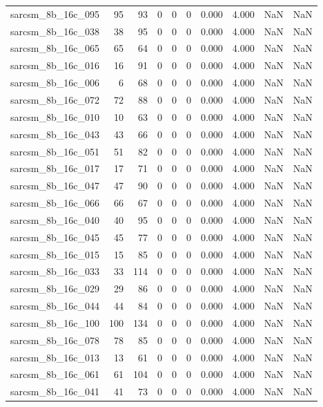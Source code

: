 \documentclass{article}
\begin{document}
\begin{longtable}{lrrrrrrrrr}
sarcsm\_8b\_16c\_095 & 95 & 93 & 0 & 0 & 0 & 0.000 & 4.000 & NaN & NaN \\
sarcsm\_8b\_16c\_038 & 38 & 95 & 0 & 0 & 0 & 0.000 & 4.000 & NaN & NaN \\
sarcsm\_8b\_16c\_065 & 65 & 64 & 0 & 0 & 0 & 0.000 & 4.000 & NaN & NaN \\
sarcsm\_8b\_16c\_016 & 16 & 91 & 0 & 0 & 0 & 0.000 & 4.000 & NaN & NaN \\
sarcsm\_8b\_16c\_006 & 6 & 68 & 0 & 0 & 0 & 0.000 & 4.000 & NaN & NaN \\
sarcsm\_8b\_16c\_072 & 72 & 88 & 0 & 0 & 0 & 0.000 & 4.000 & NaN & NaN \\
sarcsm\_8b\_16c\_010 & 10 & 63 & 0 & 0 & 0 & 0.000 & 4.000 & NaN & NaN \\
sarcsm\_8b\_16c\_043 & 43 & 66 & 0 & 0 & 0 & 0.000 & 4.000 & NaN & NaN \\
sarcsm\_8b\_16c\_051 & 51 & 82 & 0 & 0 & 0 & 0.000 & 4.000 & NaN & NaN \\
sarcsm\_8b\_16c\_017 & 17 & 71 & 0 & 0 & 0 & 0.000 & 4.000 & NaN & NaN \\
sarcsm\_8b\_16c\_047 & 47 & 90 & 0 & 0 & 0 & 0.000 & 4.000 & NaN & NaN \\
sarcsm\_8b\_16c\_066 & 66 & 67 & 0 & 0 & 0 & 0.000 & 4.000 & NaN & NaN \\
sarcsm\_8b\_16c\_040 & 40 & 95 & 0 & 0 & 0 & 0.000 & 4.000 & NaN & NaN \\
sarcsm\_8b\_16c\_045 & 45 & 77 & 0 & 0 & 0 & 0.000 & 4.000 & NaN & NaN \\
sarcsm\_8b\_16c\_015 & 15 & 85 & 0 & 0 & 0 & 0.000 & 4.000 & NaN & NaN \\
sarcsm\_8b\_16c\_033 & 33 & 114 & 0 & 0 & 0 & 0.000 & 4.000 & NaN & NaN \\
sarcsm\_8b\_16c\_029 & 29 & 86 & 0 & 0 & 0 & 0.000 & 4.000 & NaN & NaN \\
sarcsm\_8b\_16c\_044 & 44 & 84 & 0 & 0 & 0 & 0.000 & 4.000 & NaN & NaN \\
sarcsm\_8b\_16c\_100 & 100 & 134 & 0 & 0 & 0 & 0.000 & 4.000 & NaN & NaN \\
sarcsm\_8b\_16c\_078 & 78 & 85 & 0 & 0 & 0 & 0.000 & 4.000 & NaN & NaN \\
sarcsm\_8b\_16c\_013 & 13 & 61 & 0 & 0 & 0 & 0.000 & 4.000 & NaN & NaN \\
sarcsm\_8b\_16c\_061 & 61 & 104 & 0 & 0 & 0 & 0.000 & 4.000 & NaN & NaN \\
sarcsm\_8b\_16c\_041 & 41 & 73 & 0 & 0 & 0 & 0.000 & 4.000 & NaN & NaN \\

\end{longtable}
\end{document}
